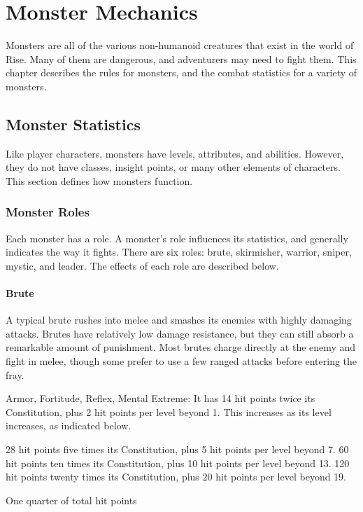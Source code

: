 \chapter{Monster Mechanics}

Monsters are all of the various non-humanoid creatures that exist in the world of Rise.
Many of them are dangerous, and adventurers may need to fight them.
This chapter describes the rules for monsters, and the combat statistics for a variety of monsters.

\section{Monster Statistics}
    Like player characters, monsters have levels, attributes, and abilities.
    However, they do not have classes, insight points, or many other elements of characters.
    This section defines how monsters function.

    \subsection{Monster Roles}
        Each monster has a role.
        A monster's role influences its statistics, and generally indicates the way it fights.
        There are six roles: brute, skirmisher, warrior, sniper, mystic, and leader.
        The effects of each role are described below.

        \subsubsection{Brute}
            A typical brute rushes into melee and smashes its enemies with highly damaging attacks.
            Brutes have relatively low damage resistance, but they can still absorb a remarkable amount of punishment.
            Most brutes charge directly at the enemy and fight in melee, though some prefer to use a few ranged attacks before entering the fray.

              Armor,  Fortitude,  Reflex,  Mental
             Extreme: It has 14 hit points \add twice its Constitution, plus 2 hit points per level beyond 1.
                This increases as its level increases, as indicated below.
                \begin{itemize}
                     28 hit points \add five times its Constitution, plus 5 hit points per level beyond 7.
                     60 hit points \add ten times its Constitution, plus 10 hit points per level beyond 13.
                     120 hit points \add twenty times its Constitution, plus 20 hit points per level beyond 19.
                \end{itemize}
             One quarter of total hit points

